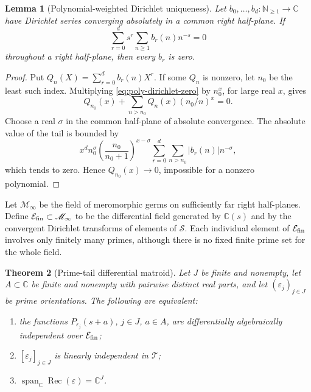 \documentclass[11pt]{article}
\newtheorem{theorem}{Theorem}[section]
\newtheorem{lemma}[theorem]{Lemma}
\theoremstyle{definition}
\theoremstyle{remark}
\newcommand{\C}{\mathbb C}
\newcommand{\N}{\mathbb N}
\newcommand{\cT}{\mathcal T}
\newcommand{\cE}{\mathcal E}
\newcommand{\Span}{\operatorname{span}}
\begin{document}
\begin{lemma}[Polynomial-weighted Dirichlet uniqueness]
\label{lem:polynomial-dirichlet}
Let \(b_0,\ldots,b_d:\N_{\geq1}\to\C\) have Dirichlet series converging absolutely in a
common right half-plane.  If
\begin{equation}\label{eq:poly-dirichlet-zero}
  \sum_{r=0}^d s^r\sum_{n\geq1}b_r(n)n^{-s}=0
\end{equation}
throughout a right half-plane, then every \(b_r\) is zero.
\end{lemma}

\begin{proof}
Put \(Q_n(X)=\sum_{r=0}^db_r(n)X^r\).  If some \(Q_n\) is nonzero, let \(n_0\) be the
least such index.  Multiplying \eqref{eq:poly-dirichlet-zero} by \(n_0^x\), for large real
\(x\), gives
\[
  Q_{n_0}(x)+\sum_{n>n_0}Q_n(x)(n_0/n)^x=0.
\]
Choose a real \(\sigma\) in the common half-plane of absolute convergence.  The absolute value
of the tail is bounded by
\[
  x^dn_0^\sigma
  \left(\frac{n_0}{n_0+1}\right)^{x-\sigma}
  \sum_{r=0}^d\sum_{n>n_0}|b_r(n)|n^{-\sigma},
\]
which tends to zero.  Hence \(Q_{n_0}(x)\to0\), impossible for a nonzero polynomial.
\end{proof}

Let \(\mathscr M_\infty\) be the field of meromorphic germs on sufficiently far right
half-planes.  Define \(\cE_{\rm fin}\subset\mathscr M_\infty\) to be the differential field
generated by \(\C(s)\) and by the convergent Dirichlet transforms of elements of
\(\mathscr S\).  Each individual element of \(\cE_{\rm fin}\) involves only finitely many
primes, although there is no fixed finite prime set for the whole field.

\begin{theorem}[Prime-tail differential matroid]\label{thm:prime-tail-matroid}
Let \(J\) be finite and nonempty, let \(A\subset\C\) be finite and nonempty with pairwise
distinct real parts, and let \((\varepsilon_j)_{j\in J}\) be prime orientations.  The following
are equivalent:
\begin{enumerate}[label=\textup{(\roman*)},leftmargin=2.2em]
  \item the functions
  \(P_{\varepsilon_j}(s+a)\), \(j\in J\), \(a\in A\), are differentially
  algebraically independent over \(\cE_{\rm fin}\);
  \item \([\varepsilon_j]_{j\in J}\) is linearly independent in \(\cT\);
  \item \(\Span_\C\operatorname{Rec}(\varepsilon)=\C^J\).
\end{enumerate}
\end{theorem}
\end{document}
